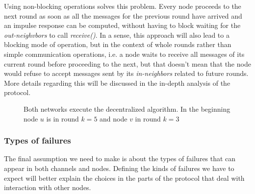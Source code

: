 \documentclass[a4paper,11pt,twoside]{report}
\begin{document}
Using non-blocking operations solves this problem. Every node proceeds to the next round as soon as all the messages for the previous round have arrived and an impulse response can be computed, without having to block waiting for the \textit{out-neighvbors} to call \textit{receive()}. In a sense, this approach will also lead to a blocking mode of operation, but in the context of whole rounds rather than simple communication operations, i.e. a node waits to receive all messages of its current round before proceeding to the next, but that doesn't mean that the node would refuse to accept messages sent by its \textit{in-neighbors} related to future rounds. More details regarding this will be discussed in the in-depth analysis of the protocol. 

\begin{figure}[h]
\centering
{}\hfill
{}

\caption{Both networks execute the decentralized algorithm. In the beginning node $u$ is in round $k=5 $ and node $v$ in round $k=3$}
\label{fig:sending_operation}

\end{figure}

\subsubsection*{Types of failures}

The final assumption we need to make is about the types of failures that can appear in both channels and nodes. Defining the kinds of failures we have to expect will better explain the choices in the parts of the protocol that deal with interaction with other nodes.\\
\end{document}
